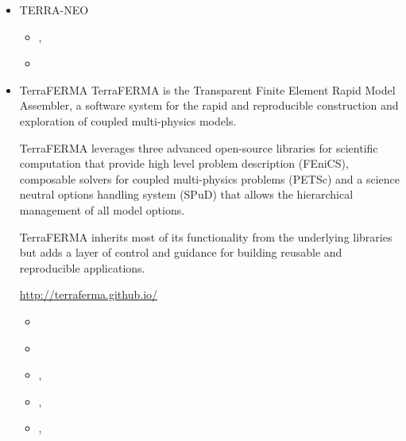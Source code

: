 \begin{itemize}
\item {\codefont TERRA-NEO} 

\begin{scriptsize}
\begin{itemize}
\item[\twothousandfifteen] \textcite{gmrs15}, \textcite{wegg15}
\item[\twothousandtwenty]  \textcite{babd20}
\end{itemize}
\end{scriptsize}

\item {\codefont TerraFERMA} 
TerraFERMA is the Transparent Finite Element Rapid Model Assembler, a software 
system for the rapid and reproducible construction and exploration of coupled multi-physics models.

TerraFERMA leverages three advanced open-source libraries for scientific computation that 
provide high level problem description (FEniCS), composable solvers for coupled multi-physics 
problems (PETSc) and a science neutral options handling system (SPuD) that allows the hierarchical 
management of all model options.

TerraFERMA inherits most of its functionality from the underlying libraries but adds a layer of 
control and guidance for building reusable and reproducible applications.

\url{http://terraferma.github.io/}

\begin{scriptsize}
\begin{itemize}
\item[\twothousandfourteen]  \textcite{wisv14}
\item[\twothousandsixteen]   \textcite{spmw16}
\item[\twothousandseventeen] \textcite{wisv17}, \textcite{ceww17}
\item[\twothousandnineteen]  \textcite{ceww19}, \textcite{perr19}
\item[\twothousandtwenty]    \textcite{siss20}, \textcite{abvw20}
\end{itemize}
\end{scriptsize}


\end{itemize}
